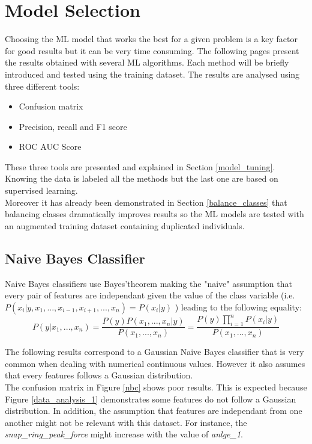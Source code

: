 \section{Model Selection}
Choosing the ML model that works the best for a given problem is a key factor for good results but it can be very time consuming. The following pages present the results obtained with several ML algorithms. Each method will be briefly introduced and tested using the training dataset. The results are analysed using three different tools:
\begin{itemize}
    \item Confusion matrix
    \item Precision, recall and F1 score
    \item ROC AUC Score
\end{itemize}
These three tools are presented and explained in Section \ref{model_tuning}.\\
Knowing the data is labeled all the methods but the last one are based on supervised learning.\\
Moreover it has already been demonstrated in Section \ref{balance_classes} that balancing classes dramatically improves results so the ML models are tested with an augmented training dataset containing duplicated individuals.


\subsection{Naive Bayes Classifier}
Naive Bayes classifiers use Bayes'theorem making the "naive" assumption that every pair of features are independant given the value of the class variable \cite{nbc_scikit} (i.e. \(P(x_i | y, x_1,..., x_{i-1}, x_{i+1},..., x_n) = P(x_i | y)\) ) leading to the following equality:
\[ P(y | x_1,..., x_n) = \frac{P(y)P(x_1,..., x_n | y)}{P(x_1,..., x_n)} = \frac{P(y)\prod_{i=1}^n P(x_i | y)}{P(x_1,..., x_n)} \]

The following results correspond to a Gaussian Naive Bayes \cite{nbcg_scikit} classifier that is very common when dealing with numerical continuous values. However it also assumes that every features follows a Gaussian distribution.\\

The confusion matrix in Figure \ref{nbc} shows poor results. This is expected because Figure \ref{data_analysis_1} demonstrates some features do not follow a Gaussian distribution. In addition, the assumption that features are independant from one another might not be relevant with this dataset. For instance, the \textit{snap\_ring\_peak\_force} might increase with the value of \textit{anlge\_1}.

